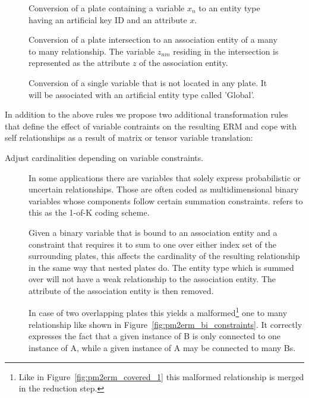 \begin{figure}
\centering
\scalebox{\tikzScale}{\adjustTikzSize }
\caption{Conversion of a plate containing a variable $x_n$ to an entity type having an artificial key ID and an attribute $x$.}\label{fig:pm2erm_uno_local}
\end{figure}

\begin{figure}
\centering
\scalebox{\tikzScale}{\adjustTikzSize }
\caption{Conversion of a plate intersection to an association entity of a many to many relationship. The variable $z_{nm}$ residing in the intersection is represented as the attribute $z$ of the association entity.}\label{fig:pm2erm_bi_noconstraints}
\end{figure}

\begin{figure}
\centering
\scalebox{\tikzScale}{\adjustTikzSize }
\caption{Conversion of a single variable that is not located in any plate. It will be associated with an artificial entity type called 'Global'.}\label{fig:pm2erm_uno_global}
\end{figure}

In addition to the above rules we propose two additional transformation rules that define the effect of variable contraints on the resulting ERM and cope with self relationships as a result of matrix or tensor variable translation:

\begin{description}
\item[Adjust cardinalities depending on variable constraints.] In some applications there are variables that solely express probabilistic or uncertain relationships. Those are often coded as multidimensional binary variables whose components follow certain summation constraints. \textcite{bishop2006pattern} refers to this as the 1-of-K coding scheme.

Given a binary variable that is bound to an association entity and a constraint that requires it to sum to one over either index set of the surrounding plates, this affects the cardinality of the resulting relationship in the same way that nested plates do. The entity type which is summed over will not have a weak relationship to the association entity. The attribute of the association entity is then removed.

In case of two overlapping plates this yields a malformed\footnote{Like in Figure~\ref{fig:pm2erm_covered_1} this malformed relationship is merged in the reduction step.} one to many relationship like shown in Figure~\ref{fig:pm2erm_bi_constraints}. It correctly expresses the fact that a given instance of B is only connected to one instance of A, while a given instance of A may be connected to many Bs.
\end{description}

